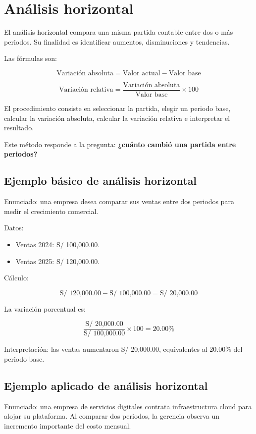 \section{Análisis horizontal}

El análisis horizontal compara una misma partida contable entre dos o más periodos. Su finalidad es identificar aumentos, disminuciones y tendencias.

Las fórmulas son:

\[
\text{Variación absoluta} = \text{Valor actual} - \text{Valor base}
\]

\[
\text{Variación relativa} =
\frac{\text{Variación absoluta}}{\text{Valor base}} \times 100
\]

El procedimiento consiste en seleccionar la partida, elegir un periodo base, calcular la variación absoluta, calcular la variación relativa e interpretar el resultado.

Este método responde a la pregunta: \textbf{¿cuánto cambió una partida entre periodos?}

\subsection{Ejemplo básico de análisis horizontal}

Enunciado: una empresa desea comparar sus ventas entre dos periodos para medir el crecimiento comercial.

Datos:

\begin{itemize}
  \item Ventas 2024: S/ 100,000.00.
  \item Ventas 2025: S/ 120,000.00.
\end{itemize}

Cálculo:

\[
\text{S/ 120,000.00} - \text{S/ 100,000.00} = \text{S/ 20,000.00}
\]

La variación porcentual es:

\[
\frac{\text{S/ 20,000.00}}{\text{S/ 100,000.00}} \times 100 = 20.00\%
\]

Interpretación: las ventas aumentaron S/ 20,000.00, equivalentes al 20.00\% del periodo base.

\subsection{Ejemplo aplicado de análisis horizontal}

Enunciado: una empresa de servicios digitales contrata infraestructura cloud para alojar su plataforma. Al comparar dos periodos, la gerencia observa un incremento importante del costo mensual.


